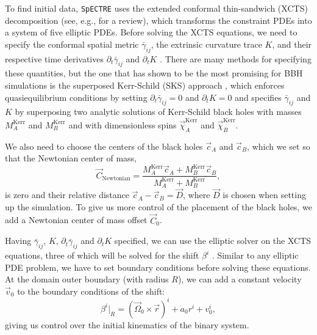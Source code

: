 \documentclass{../document}
\begin{document}
      To find initial data, {\tt SpECTRE} uses the extended conformal thin-sandwich (XCTS) decomposition (see, e.g., \cite{BaumgarteShapiro} for a review), which transforms the constraint PDEs into a system of five elliptic PDEs. Before solving the XCTS equations, we need to specify the conformal spatial metric $\bar\gamma_{ij}$, the extrinsic curvature trace $K$, and their respective time derivatives $\partial_t \bar\gamma_{ij}$ and $\partial_t K$ \cite{BaumgarteShapiro}. There are many methods for specifying these quantities, but the one that has shown to be the most promising for BBH simulations is the superposed Kerr-Schild (SKS) approach \cite{Lovelace2008}, which enforces quasiequilibrium conditions by setting $\partial_t \bar\gamma_{ij}=0$ and $\partial_t K=0$ and specifies $\bar\gamma_{ij}$ and $K$ by superposing two analytic solutions of Kerr-Schild black holes with masses $M^\text{Kerr}_A$ and $M^\text{Kerr}_B$ and with dimensionless spins $\vec\chi^\text{Kerr}_A$ and $\vec\chi^\text{Kerr}_B$.
      
      We also need to choose the centers of the black holes $\vec c_A$ and $\vec c_B$, which we set so that the Newtonian center of mass,
      \begin{equation}
        \vec C_\text{Newtonian} = \frac{M^\text{Kerr}_A \vec c_A + M^\text{Kerr}_B \vec c_B}{M^\text{Kerr}_A + M^\text{Kerr}_B},
      \end{equation}
      is zero and their relative distance $\vec c_A - \vec c_B = \vec D$, where $\vec D$ is chosen when setting up the simulation. To give us more control of the placement of the black holes, we add a Newtonian center of mass offset $\vec C_0$.

      Having $\bar\gamma_{ij}$, $K$, $\partial_t \bar\gamma_{ij}$ and $\partial_t K$ specified, we can use the elliptic solver on the XCTS equations, three of which will be solved for the shift $\beta^i$ \cite{BaumgarteShapiro}. Similar to any elliptic PDE problem, we have to set boundary conditions before solving these equations. At the domain outer boundary (with radius $R$), we can add a constant velocity $\vec v_0$ to the boundary conditions of the shift:
      \begin{equation} \label{eq:shift-boundary-condition}
        \beta^i|_R = (\vec \Omega_0 \times \vec r)^i + \dot a_0 r^i + v_0^i,
      \end{equation}
      giving us control over the initial kinematics of the binary system.
\end{document}
